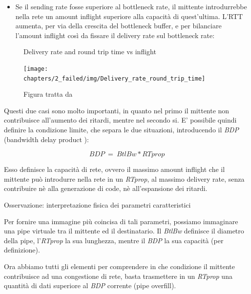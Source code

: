 \begin{itemize}

\item Se il sending rate fosse superiore al bottleneck rate, il mittente introdurrebbe nella rete un amount inflight superiore alla capacità di quest'ultima. L'RTT aumenta, per via della crescita del bottleneck buffer, e per bilanciare l'amount inflight così da fissare il delivery rate sul bottleneck rate:

\end{itemize}

\begin{figure}[H]

\center
\caption{Delivery rate and round trip time vs inflight}
\label{Delivery_rate_round_trip_time}
\texttt{[image: chapters/2\_failed/img/Delivery\_rate\_round\_trip\_time]}
\caption*{Figura tratta da \cite[p.~60]{Cardwell:2017:BCC:3042068.3009824}}

\end{figure}

Questi due casi sono molto importanti, in quanto nel primo il mittente non contribuisce all'aumento dei ritardi, mentre nel secondo si. E' possibile quindi definire la condizione limite, che separa le due situazioni, introducendo il \textit{BDP} (bandwidth delay product \cite[p.~59]{Cardwell:2017:BCC:3042068.3009824}):

\[ BDP \:=\: BtlBw * RTprop \]

Esso definisce la capacità di rete, ovvero il massimo amount inflight che il mittente può introdurre nella rete in un \textit{RTprop}, al massimo delivery rate, senza contribuire nè alla generazione di code, nè all'espansione dei ritardi. \bigskip

\begin{suggerimento}{Osservazione: interpretazione fisica dei parametri caratteristici}

Per fornire una immagine più coincisa di tali parametri, possiamo immaginare una pipe virtuale tra il mittente ed il destinatario. Il \textit{BtlBw} definisce il diametro della pipe, l’\textit{RTprop} la sua lunghezza, mentre il \textit{BDP} la sua capacità (per definizione). \bigskip

\end{suggerimento}

Ora abbiamo tutti gli elementi per comprendere in che condizione il mittente contribuisce ad una congestione di rete, basta trasmettere in un \textit{RTprop} una quantità di dati superiore al \textit{BDP} corrente (pipe overfill). \bigskip

